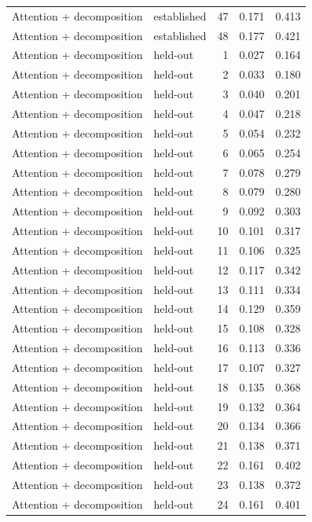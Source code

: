 \begin{tabular}{llrrr}
Attention + decomposition & established & 47 & 0.171 & 0.413 \\
Attention + decomposition & established & 48 & 0.177 & 0.421 \\
Attention + decomposition & held-out & 1 & 0.027 & 0.164 \\
Attention + decomposition & held-out & 2 & 0.033 & 0.180 \\
Attention + decomposition & held-out & 3 & 0.040 & 0.201 \\
Attention + decomposition & held-out & 4 & 0.047 & 0.218 \\
Attention + decomposition & held-out & 5 & 0.054 & 0.232 \\
Attention + decomposition & held-out & 6 & 0.065 & 0.254 \\
Attention + decomposition & held-out & 7 & 0.078 & 0.279 \\
Attention + decomposition & held-out & 8 & 0.079 & 0.280 \\
Attention + decomposition & held-out & 9 & 0.092 & 0.303 \\
Attention + decomposition & held-out & 10 & 0.101 & 0.317 \\
Attention + decomposition & held-out & 11 & 0.106 & 0.325 \\
Attention + decomposition & held-out & 12 & 0.117 & 0.342 \\
Attention + decomposition & held-out & 13 & 0.111 & 0.334 \\
Attention + decomposition & held-out & 14 & 0.129 & 0.359 \\
Attention + decomposition & held-out & 15 & 0.108 & 0.328 \\
Attention + decomposition & held-out & 16 & 0.113 & 0.336 \\
Attention + decomposition & held-out & 17 & 0.107 & 0.327 \\
Attention + decomposition & held-out & 18 & 0.135 & 0.368 \\
Attention + decomposition & held-out & 19 & 0.132 & 0.364 \\
Attention + decomposition & held-out & 20 & 0.134 & 0.366 \\
Attention + decomposition & held-out & 21 & 0.138 & 0.371 \\
Attention + decomposition & held-out & 22 & 0.161 & 0.402 \\
Attention + decomposition & held-out & 23 & 0.138 & 0.372 \\
Attention + decomposition & held-out & 24 & 0.161 & 0.401 \\

\end{tabular}
